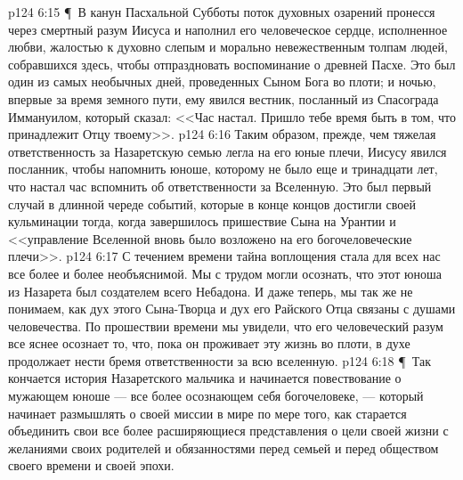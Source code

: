 \vs p124 6:15 \P\ В канун Пасхальной Субботы поток духовных озарений пронесся через смертный разум Иисуса и наполнил его человеческое сердце, исполненное любви, жалостью к духовно слепым и морально невежественным толпам людей, собравшихся здесь, чтобы отпраздновать воспоминание о древней Пасхе. Это был один из самых необычных дней, проведенных Сыном Бога во плоти; и ночью, впервые за время земного пути, ему явился вестник, посланный из Спасограда Иммануилом, который сказал: <<Час настал. Пришло тебе время быть в том, что принадлежит Отцу твоему>>.
\vs p124 6:16 Таким образом, прежде, чем тяжелая ответственность за Назаретскую семью легла на его юные плечи, Иисусу явился посланник, чтобы напомнить юноше, которому не было еще и тринадцати лет, что настал час вспомнить об ответственности за Вселенную. Это был первый случай в длинной череде событий, которые в конце концов достигли своей кульминации тогда, когда завершилось пришествие Сына на Урантии и <<управление Вселенной вновь было возложено на его богочеловеческие плечи>>.
\vs p124 6:17 С течением времени тайна воплощения стала для всех нас все более и более необъяснимой. Мы с трудом могли осознать, что этот юноша из Назарета был создателем всего Небадона. И даже теперь, мы так же не понимаем, как дух этого Сына\hyp{}Творца и дух его Райского Отца связаны с душами человечества. По прошествии времени мы увидели, что его человеческий разум все яснее осознает то, что, пока он проживает эту жизнь во плоти, в духе продолжает нести бремя ответственности за всю вселенную.
\vs p124 6:18 \P\ Так кончается история Назаретского мальчика и начинается повествование о мужающем юноше --- все более осознающем себя богочеловеке, --- который начинает размышлять о своей миссии в мире по мере того, как старается объединить свои все более расширяющиеся представления о цели своей жизни с желаниями своих родителей и обязанностями перед семьей и перед обществом своего времени и своей эпохи.
